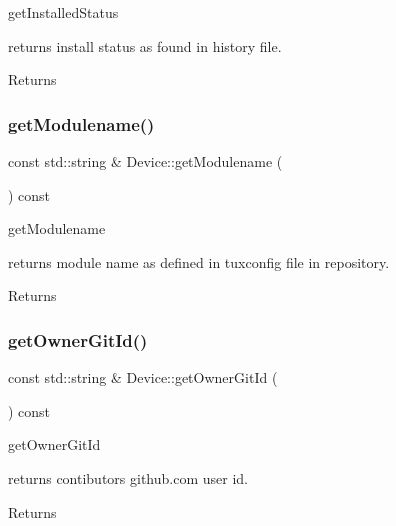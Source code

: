 get\+Installed\+Status 

returns install status as found in history file. \begin{DoxyReturn}{Returns}

\end{DoxyReturn}
\mbox{\label{classDevice_a77eeec87fea2ffc4d4140b315613bb1b}} 
\subsubsection{\texorpdfstring{get\+Modulename()}{getModulename()}}
{\footnotesize\ttfamily const std\+::string \& Device\+::get\+Modulename (\begin{DoxyParamCaption}{ }\end{DoxyParamCaption}) const}



get\+Modulename 

returns module name as defined in tuxconfig file in repository. \begin{DoxyReturn}{Returns}

\end{DoxyReturn}
\mbox{\label{classDevice_a2b4556e5a3b1f955c3e498e1de75051c}} 
\subsubsection{\texorpdfstring{get\+Owner\+Git\+Id()}{getOwnerGitId()}}
{\footnotesize\ttfamily const std\+::string \& Device\+::get\+Owner\+Git\+Id (\begin{DoxyParamCaption}{ }\end{DoxyParamCaption}) const}



get\+Owner\+Git\+Id 

returns contibutors github.\+com user id. \begin{DoxyReturn}{Returns}

\end{DoxyReturn}
\mbox{\label{classDevice_a3c0a93766217f57848cf6871aeb9ffc2}} 
